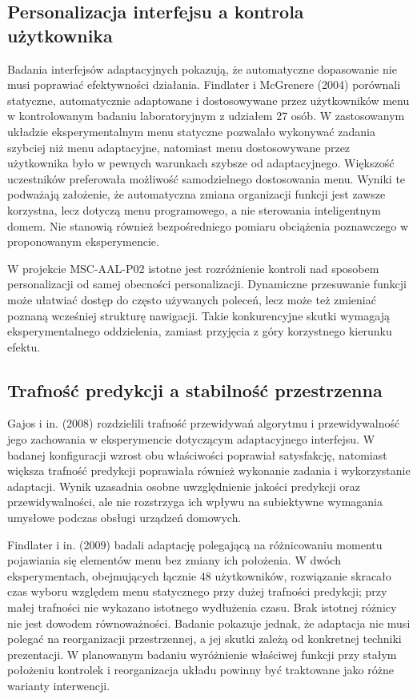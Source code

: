\documentclass[11pt,a4paper]{article}
\begin{document}
\subsection{Personalizacja interfejsu a kontrola użytkownika}

Badania interfejsów adaptacyjnych pokazują, że automatyczne dopasowanie nie musi poprawiać efektywności działania. Findlater i McGrenere (2004) porównali statyczne, automatycznie adaptowane i dostosowywane przez użytkowników menu w kontrolowanym badaniu laboratoryjnym z udziałem 27 osób. W zastosowanym układzie eksperymentalnym menu statyczne pozwalało wykonywać zadania szybciej niż menu adaptacyjne, natomiast menu dostosowywane przez użytkownika było w pewnych warunkach szybsze od adaptacyjnego. Większość uczestników preferowała możliwość samodzielnego dostosowania menu. Wyniki te podważają założenie, że automatyczna zmiana organizacji funkcji jest zawsze korzystna, lecz dotyczą menu programowego, a nie sterowania inteligentnym domem. Nie stanowią również bezpośredniego pomiaru obciążenia poznawczego w proponowanym eksperymencie.

W projekcie MSC-AAL-P02 istotne jest rozróżnienie kontroli nad sposobem personalizacji od samej obecności personalizacji. Dynamiczne przesuwanie funkcji może ułatwiać dostęp do często używanych poleceń, lecz może też zmieniać poznaną wcześniej strukturę nawigacji. Takie konkurencyjne skutki wymagają eksperymentalnego oddzielenia, zamiast przyjęcia z góry korzystnego kierunku efektu.

\subsection{Trafność predykcji a stabilność przestrzenna}

Gajos i in. (2008) rozdzielili trafność przewidywań algorytmu i przewidywalność jego zachowania w eksperymencie dotyczącym adaptacyjnego interfejsu. W badanej konfiguracji wzrost obu właściwości poprawiał satysfakcję, natomiast większa trafność predykcji poprawiała również wykonanie zadania i wykorzystanie adaptacji. Wynik uzasadnia osobne uwzględnienie jakości predykcji oraz przewidywalności, ale nie rozstrzyga ich wpływu na subiektywne wymagania umysłowe podczas obsługi urządzeń domowych.

Findlater i in. (2009) badali adaptację polegającą na różnicowaniu momentu pojawiania się elementów menu bez zmiany ich położenia. W dwóch eksperymentach, obejmujących łącznie 48 użytkowników, rozwiązanie skracało czas wyboru względem menu statycznego przy dużej trafności predykcji; przy małej trafności nie wykazano istotnego wydłużenia czasu. Brak istotnej różnicy nie jest dowodem równoważności. Badanie pokazuje jednak, że adaptacja nie musi polegać na reorganizacji przestrzennej, a jej skutki zależą od konkretnej techniki prezentacji. W planowanym badaniu wyróżnienie właściwej funkcji przy stałym położeniu kontrolek i reorganizacja układu powinny być traktowane jako różne warianty interwencji.
\end{document}
